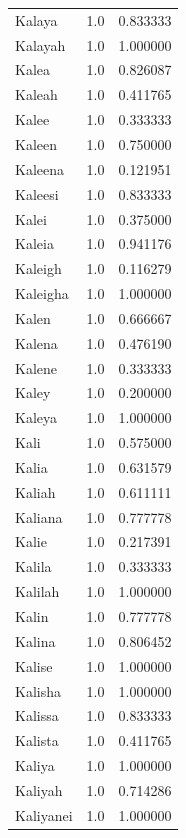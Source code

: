 \documentclass[
  letterpaper,
  DIV=11,
  numbers=noendperiod]{scrreprt}
\begin{document}
\begin{tabular}{lrr}
Kalaya          &   1.0 &   0.833333 \\
Kalayah         &   1.0 &   1.000000 \\
Kalea           &   1.0 &   0.826087 \\
Kaleah          &   1.0 &   0.411765 \\
Kalee           &   1.0 &   0.333333 \\
Kaleen          &   1.0 &   0.750000 \\
Kaleena         &   1.0 &   0.121951 \\
Kaleesi         &   1.0 &   0.833333 \\
Kalei           &   1.0 &   0.375000 \\
Kaleia          &   1.0 &   0.941176 \\
Kaleigh         &   1.0 &   0.116279 \\
Kaleigha        &   1.0 &   1.000000 \\
Kalen           &   1.0 &   0.666667 \\
Kalena          &   1.0 &   0.476190 \\
Kalene          &   1.0 &   0.333333 \\
Kaley           &   1.0 &   0.200000 \\
Kaleya          &   1.0 &   1.000000 \\
Kali            &   1.0 &   0.575000 \\
Kalia           &   1.0 &   0.631579 \\
Kaliah          &   1.0 &   0.611111 \\
Kaliana         &   1.0 &   0.777778 \\
Kalie           &   1.0 &   0.217391 \\
Kalila          &   1.0 &   0.333333 \\
Kalilah         &   1.0 &   1.000000 \\
Kalin           &   1.0 &   0.777778 \\
Kalina          &   1.0 &   0.806452 \\
Kalise          &   1.0 &   1.000000 \\
Kalisha         &   1.0 &   1.000000 \\
Kalissa         &   1.0 &   0.833333 \\
Kalista         &   1.0 &   0.411765 \\
Kaliya          &   1.0 &   1.000000 \\
Kaliyah         &   1.0 &   0.714286 \\
Kaliyanei       &   1.0 &   1.000000 \\

\end{tabular}
\end{document}
